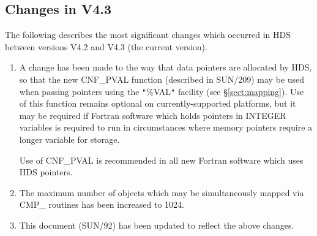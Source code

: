 \documentclass[11pt]{article}
\newcommand{\xref}[3]{#1}
\newcommand{\xlabel}[1]{}
\newcommand{\qt}[1]{``#1''}
\renewcommand{\qt}[1]{{\tt{"}}#1{\tt{"}}}
\begin{document}
\newpage
\subsection{\xlabel{list_of_most_recent_changes}Changes in V4.3}

The following describes the most significant changes which occurred in HDS
between versions V4.2 and V4.3 (the current version).

\begin{enumerate}
\item A change has been made to the way that data pointers are
allocated by HDS, so that the new \xref{CNF\_PVAL}{sun209}{CNF_PVAL}
function (described in \xref{SUN/209}{sun209}{}) may be used when
passing pointers using the \qt{\%VAL} facility (see
\S\ref{sect:mapping}). Use of this function remains optional on
currently-supported platforms, but it may be required if Fortran
software which holds pointers in INTEGER variables is required to run
in circumstances where memory pointers require a longer variable for
storage.

Use of CNF\_PVAL is recommended in all new Fortran software which uses
HDS pointers.

\item The maximum number of objects which may be simultaneously mapped
via CMP\_ routines has been increased to 1024.

\item This document (\xref{SUN/92}{sun92}{}) has been updated to
reflect the above changes.
\end{enumerate}
\end{document}
